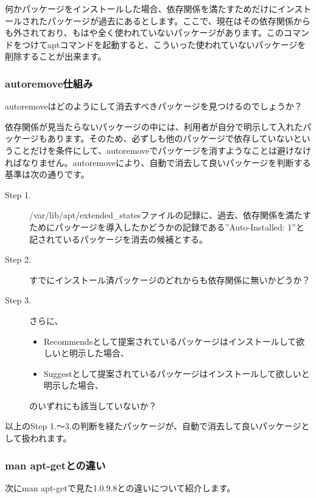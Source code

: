\documentclass[mingoth,a4paper]{jsarticle}
\begin{document}
 何かパッケージをインストールした場合、依存関係を満たすためだけにインストールされたパッケージが過去にあるとします。ここで、現在はその依存関係からも外されており、もはや全く使われていないパッケージがあります。このコマンドをつけてaptコマンドを起動すると、こういった使われていないパッケージを削除することが出来ます。


\subsubsection{autoremove仕組み}

 autoremoveはどのようにして消去すべきパッケージを見つけるのでしょうか？

 依存関係が見当たらないパッケージの中には、利用者が自分で明示して入れたパッケージもあります。そのため、必ずしも他のパッケージで依存していないということだけを条件にして、autoremoveでパッケージを消すようなことは避けなければなりません。autoremoveにより、自動で消去して良いパッケージを判断する基準は次の通りです。
 
\begin{description}
 \item [Step 1.] /var/lib/apt/extended\_statesファイルの記録に、過去、依存関係を満たすためにパッケージを導入したかどうかの記録である''Auto-Installed: 1''と記されているパッケージを消去の候補とする。
 \item [Step 2.] すでにインストール済パッケージのどれからも依存関係に無いかどうか？
 \item [Step 3.] さらに、
\begin{itemize}
\item Recommendsとして提案されているパッケージはインストールして欲しいと明示した場合、
\item Suggestとして提案されているパッケージはインストールして欲しいと明示した場合、
\end{itemize}
のいずれにも該当していないか？
\end{description}

以上のStep 1.〜3.の判断を経たパッケージが、自動で消去して良いパッケージとして扱われます。

\subsubsection{man apt-getとの違い}

次にman apt-getで見た1.0.9.8との違いについて紹介します。
\end{document}

